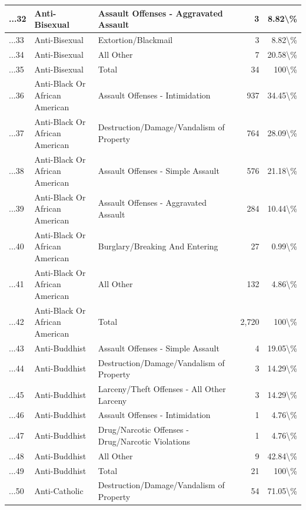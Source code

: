\documentclass[
]{krantz}
\begin{document}
\begin{longtable}[t]{l|l|l|r|r}
\hline
...32 & Anti-Bisexual & Assault Offenses - Aggravated Assault & 3 & 8.82\textbackslash{}\%\\
\hline
...33 & Anti-Bisexual & Extortion/Blackmail & 3 & 8.82\textbackslash{}\%\\
\hline
...34 & Anti-Bisexual & All Other & 7 & 20.58\textbackslash{}\%\\
\hline
...35 & Anti-Bisexual & Total & 34 & 100\textbackslash{}\%\\
\hline
...36 & Anti-Black Or African American & Assault Offenses - Intimidation & 937 & 34.45\textbackslash{}\%\\
\hline
...37 & Anti-Black Or African American & Destruction/Damage/Vandalism of Property & 764 & 28.09\textbackslash{}\%\\
\hline
...38 & Anti-Black Or African American & Assault Offenses - Simple Assault & 576 & 21.18\textbackslash{}\%\\
\hline
...39 & Anti-Black Or African American & Assault Offenses - Aggravated Assault & 284 & 10.44\textbackslash{}\%\\
\hline
...40 & Anti-Black Or African American & Burglary/Breaking And Entering & 27 & 0.99\textbackslash{}\%\\
\hline
...41 & Anti-Black Or African American & All Other & 132 & 4.86\textbackslash{}\%\\
\hline
...42 & Anti-Black Or African American & Total & 2,720 & 100\textbackslash{}\%\\
\hline
...43 & Anti-Buddhist & Assault Offenses - Simple Assault & 4 & 19.05\textbackslash{}\%\\
\hline
...44 & Anti-Buddhist & Destruction/Damage/Vandalism of Property & 3 & 14.29\textbackslash{}\%\\
\hline
...45 & Anti-Buddhist & Larceny/Theft Offenses - All Other Larceny & 3 & 14.29\textbackslash{}\%\\
\hline
...46 & Anti-Buddhist & Assault Offenses - Intimidation & 1 & 4.76\textbackslash{}\%\\
\hline
...47 & Anti-Buddhist & Drug/Narcotic Offenses - Drug/Narcotic Violations & 1 & 4.76\textbackslash{}\%\\
\hline
...48 & Anti-Buddhist & All Other & 9 & 42.84\textbackslash{}\%\\
\hline
...49 & Anti-Buddhist & Total & 21 & 100\textbackslash{}\%\\
\hline
...50 & Anti-Catholic & Destruction/Damage/Vandalism of Property & 54 & 71.05\textbackslash{}\%\\

\end{longtable}
\end{document}
